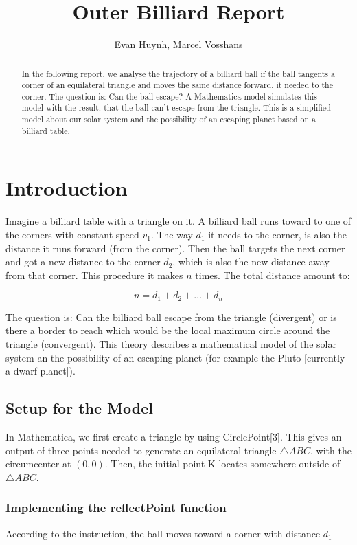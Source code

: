 \documentclass[11pt,a4paper]{article}
\begin{document}
\title{Outer Billiard Report}
\author{Evan Huynh, Marcel Vosshans}
\maketitle

\begin{abstract}
In the following report, we analyse the trajectory of a billiard ball if the ball tangents a corner of an equilateral triangle and moves the same distance forward, it needed to the corner. The question is: Can the ball escape? A Mathematica model simulates this model with the result, that the ball can’t escape from the triangle. This is a simplified model about our solar system and the possibility of an escaping planet based on a billiard table.
\end{abstract}

\tableofcontents

\section{Introduction}
Imagine a billiard table with a triangle on it. A billiard ball runs toward to one of the corners with constant speed \(v_{1}\). The way \(d_{1}\) it needs to the corner, is also the distance it runs forward (from the corner). Then the ball targets the next corner and got a new distance to the corner \(d_{2}\), which is also the new distance away from that corner. This procedure it makes \(n\) times. The total distance amount to:

\[n=d_{1}+d_{2}+\dots+d_{n}\]

The question is: Can the billiard ball escape from the triangle (divergent) or is there a border to reach which would be the local maximum circle around the triangle (convergent). This theory describes a mathematical model of the solar system an the possibility of an escaping planet (for example the Pluto [currently a dwarf planet]).
	
\subsection{Setup for the Model}
In Mathematica, we first create a triangle by using CirclePoint[3]. This gives an output of three points needed to generate an equilateral triangle \(\triangle ABC\), with the circumcenter at \((0,0)\). Then, the initial point K locates somewhere outside of \(\triangle ABC\).

\subsubsection{Implementing the reflectPoint function}
According to the instruction, the ball moves toward a corner with distance \(d_{1}\) 
\end{document}
